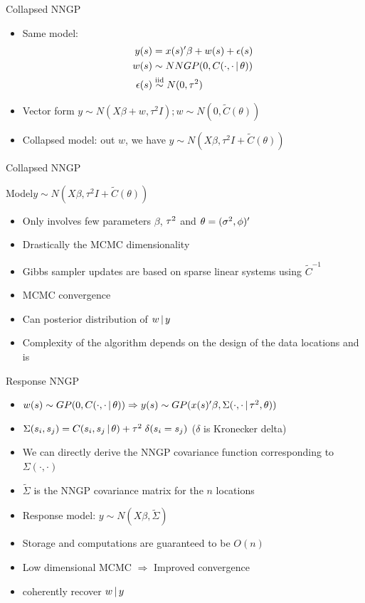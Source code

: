 \begin{frame}{Collapsed NNGP}
	\begin{itemize}
		\item Same model: 
		\begin{align*}
		y(s) &= x(s)'\beta + w(s) + \epsilon(s)\\
		w(s) &\sim NNGP(0,C(\cdot,\cdot \,|\, \theta))\\
		\epsilon(s) &\stackrel{\mathrm{iid}}{\sim} N(0,\tau^2)
		\end{align*}
		\item Vector form $y \sim N(X\beta + w, \tau^2 I); w \sim N(0, \tilde C(\theta))$
		\item \alert{Collapsed model:}  out $w$, we have $y \sim N(X\beta, \tau^2 I + \tilde C (\theta))$
	\end{itemize}
\end{frame}

\begin{frame}{Collapsed NNGP}
	\begin{alertblock}{Model}{$y \sim N(X\beta, \tau^2 I + \tilde C (\theta))$}
	\end{alertblock}
\begin{itemize}
	\item Only involves few parameters $\beta$, $\tau^2$ and $\theta=(\sigma^2, \phi)'$
	\item Drastically  the MCMC dimensionality
	\item Gibbs sampler updates are based on sparse linear systems using $\tilde C^{-1}$
	\item {} MCMC convergence
	\item Can  posterior distribution of $w \,|\, y$
	\item Complexity of the algorithm depends on the design of the data locations and is 
\end{itemize}
\end{frame}

\begin{frame}{Response NNGP}
	\begin{itemize}
		\item $w(s) \sim GP(0, C(\cdot, \cdot \,|\, \theta)) \Rightarrow y(s) \sim GP(x(s)'\beta, \Sigma(\cdot,\cdot \,|\, \tau^2, \theta))$ 
		\item $\Sigma (s_i, s_j) = C( s_i , s_j \,|\, \theta) + \tau^2 \; \delta(s_i =s_j)$ ($\delta$ is Kronecker delta)
		\item We can directly derive the NNGP covariance function corresponding to $\Sigma(\cdot,\cdot)$
		\item $\tilde \Sigma$ is the NNGP covariance matrix for the $n$ locations
		\item \alert{Response model:} $y \sim N(X\beta, \tilde \Sigma)$
		\item Storage and computations are guaranteed to be $O(n)$
		\item Low dimensional MCMC  $\Rightarrow$ Improved convergence
		\item {} coherently recover $w \,|\, y$
		\end{itemize}
\end{frame}

